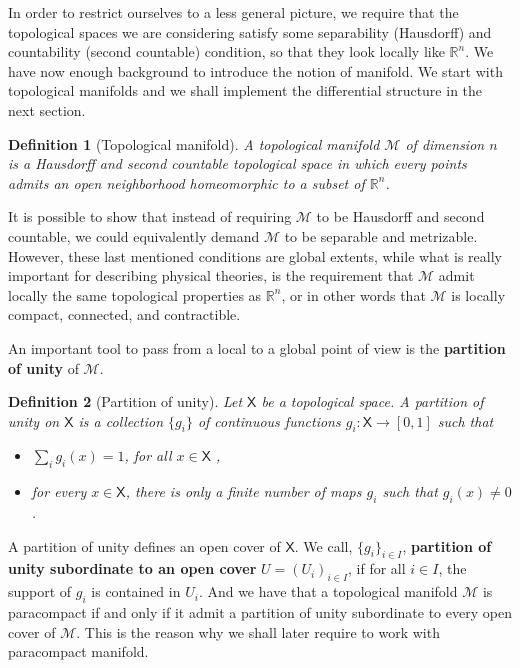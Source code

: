 \documentclass[11pt]{book}
\newcommand{\Mcal}{\mathcal{M}}
\newcommand{\Rbb}{\mathbb{R}}
\newcommand{\Xsf}{\mathsf{X}}
\theoremstyle{break}
\newtheorem{definition}{Definition}[chapter]
\begin{document}
In order to restrict ourselves to a less general picture, we require that the topological spaces we are considering satisfy some separability (Hausdorff) and countability (second countable) condition, so that they look locally like $\Rbb^n$. We have now enough background to introduce the notion of manifold. We start with topological manifolds and we shall implement the differential structure in the next section.%


\bigskip


\begin{definition}[Topological manifold]
A topological manifold $\Mcal$ of dimension $n$ is a Hausdorff and second countable topological space in which every points admits an open neighborhood homeomorphic to a subset of $\Rbb^n$.
\end{definition}


It is possible to show that instead of requiring $\Mcal$ to be Hausdorff and second countable, we could equivalently demand $\Mcal$ to be separable and metrizable. However, these last mentioned conditions are global extents, while what is really important for describing physical theories, is the requirement that $\Mcal$ admit locally the same topological properties as $\Rbb^n$, or in other words that  $\Mcal$ is locally compact, connected, and contractible.


An important tool to pass from a local to a global point of view is the \textbf{partition of unity} of $\Mcal$. 


\begin{definition}[Partition of unity]
Let $\Xsf$ be a topological space. A partition of unity on $\Xsf$ is a collection $\{g_i\}$ of continuous functions $g_i : \Xsf \to [0,1]$ such that
%
\begin{itemize}
\item $\sum_i g_i(x) = 1$, for all $x \in \Xsf$ ,
\item for every $x \in \Xsf$, there is only a finite number of maps $g_i$ such that $g_i(x) \neq 0$.
\end{itemize}
%
\end{definition}


A partition of unity defines an open cover of $\Xsf$. We call, $\{g_i\}_{i \in I}$, \textbf{partition of unity subordinate to an open cover} $U=(U_i)_{i \in I}$, if for all $i \in I$, the support of $g_i$ is contained in $U_i$. And we have that a topological manifold $\Mcal$ is paracompact if and only if it admit a partition of unity subordinate to every open cover of $\Mcal$. This is the reason why we shall later require to work with paracompact manifold.
\end{document}
